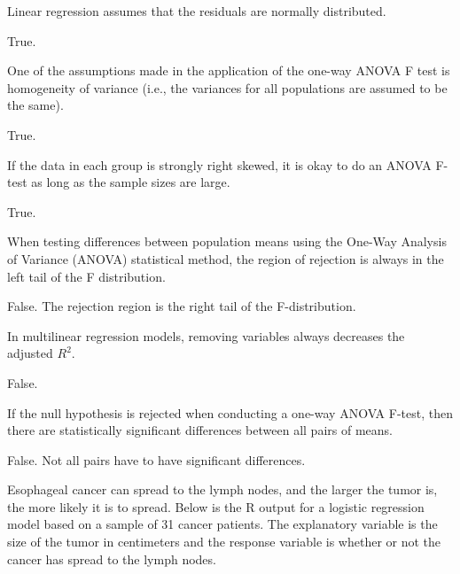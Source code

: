 \documentclass[11pt,answers]{exam}
\begin{document}
\begin{questions}
\begin{parts}
\item Linear regression assumes that the residuals are normally distributed.  
\begin{solution}
True.
\end{solution}
\vfill

\item One of the assumptions made in the application of the one-way ANOVA F test is homogeneity of variance (i.e., the variances for all populations are assumed to be the same).
\begin{solution}
True.
\end{solution}
\vfill


\item If the data in each group is strongly right skewed, it is okay to do an ANOVA F-test as long as the sample sizes are large.  
\begin{solution}
True.
\end{solution}
\vfill


\item When testing differences between population means using the One-Way Analysis of Variance (ANOVA) statistical method, the region of rejection is always in the left tail of the F distribution. 
\begin{solution}
False. The rejection region is the right tail of the F-distribution.
\end{solution}
\vfill


\item In multilinear regression models, removing variables always decreases the adjusted $R^2$.
\begin{solution}
False.
\end{solution}

\vfill


\item If the null hypothesis is rejected when conducting a one-way ANOVA F-test, then there are statistically significant differences between all pairs of means.
\begin{solution}
False. Not all pairs have to have significant differences.
\end{solution}
\vfill
\end{parts}

\newpage

\question Esophageal cancer can spread to the lymph nodes, and the larger the tumor is, the more likely it is to spread.  Below is the R output for a logistic regression model based on a sample of 31 cancer patients. The explanatory variable is the size of the tumor in centimeters and the response variable is whether or not the cancer has spread to the lymph nodes.


\end{questions}
\end{document}
